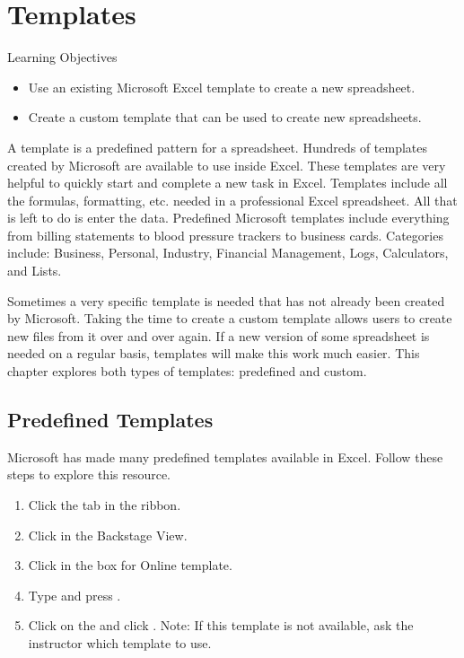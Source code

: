 \section{Templates}

\begin{center}
	\begin{objbox}{Learning Objectives}
		\begin{itemize}
			\setlength{\itemsep}{0pt}
			\setlength{\parskip}{0pt}
			\setlength{\parsep}{0pt}

			\item Use an existing Microsoft Excel template to create a new spreadsheet.
			\item Create a custom template that can be used to create new spreadsheets.
		
		\end{itemize}
	\end{objbox}
\end{center}

A template is a predefined pattern for a spreadsheet. Hundreds of templates created by Microsoft are available to use inside Excel. These templates are very helpful to quickly start and complete a new task in Excel. Templates include all the formulas, formatting, etc. needed in a professional Excel spreadsheet. All that is left to do is enter the data. Predefined Microsoft templates include everything from billing statements to blood pressure trackers to business cards. Categories include: Business, Personal, Industry, Financial Management, Logs, Calculators, and Lists.

Sometimes a very specific template is needed that has not already been created by Microsoft. Taking the time to create a custom template allows users to create new files from it over and over again. If a new version of some spreadsheet is needed on a regular basis, templates will make this work much easier. This chapter explores both types of templates: predefined and custom.

\subsection{Predefined Templates}

Microsoft has made many predefined templates available in Excel. Follow these steps to explore this resource.

\begin{enumerate}
	\item Click the  tab in the ribbon.
	\item Click  in the Backstage View.
	\item Click in the  box for Online template.
	\item Type  and press .
	\item Click on the  and click . Note: If this template is not available, ask the instructor which template to use.
\end{enumerate}

